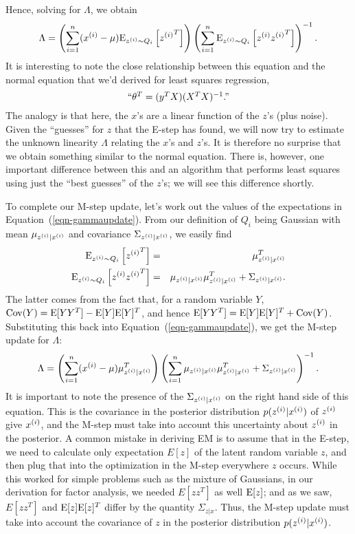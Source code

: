 \documentclass{article}
\begin{document}
Hence, solving for $\Lambda$, we obtain
\begin{equation}
\Lambda =
\left(\sum_{i=1}^{n} ({x^{(i)}}-\mu) {\rm E}_{{z^{(i)}} \sim Q_i}\left[{z^{(i)}}^T \right]\right)
\left(\sum_{i=1}^{n} {\rm E}_{{z^{(i)}} \sim Q_i} \left[ {z^{(i)}} {z^{(i)}}^T\right]\right)^{-1}.
\label{eqn-gammaupdate}
\end{equation}
It is interesting to note the close relationship between this equation and
the normal equation that we'd derived for least squares regression,
\[
\hbox{``$\theta^T = (y^TX)(X^TX)^{-1}$.''}
\]
The analogy is that here, the $x$'s are a linear function of the $z$'s (plus noise).  Given
the ``guesses'' for $z$ that the E-step has found, we will now try to estimate
the unknown linearity $\Lambda$ relating the $x$'s and $z$'s.  It is therefore no
surprise that we obtain something similar to the normal equation.  There is, however,
one important difference between this and an algorithm that performs least squares using
just the ``best guesses'' of the $z$'s; we will see this difference shortly.

To complete our M-step update, let's work out the values of the expectations in Equation~(\ref{eqn-gammaupdate}).
From our definition of $Q_i$ being Gaussian with mean $\mu_{{z^{(i)}}|{x^{(i)}}}$ and covariance $\Sigma_{{z^{(i)}}|{x^{(i)}}}$, we
easily find
\begin{eqnarray*}
{\rm E}_{{z^{(i)}} \sim Q_i}\left[{z^{(i)}}^T \right] &=& \mu_{{z^{(i)}}|{x^{(i)}}}^T \\
{\rm E}_{{z^{(i)}} \sim Q_i} \left[ {z^{(i)}} {z^{(i)}}^T\right] &=&
\mu_{{z^{(i)}}|{x^{(i)}}} \mu_{{z^{(i)}}|{x^{(i)}}}^T + \Sigma_{{z^{(i)}}|{x^{(i)}}}.
\end{eqnarray*}
The latter comes from the fact that, for a random variable $Y$,
${\rm Cov}(Y) = {\rm E}[YY^T] - {\rm E}[Y]{\rm E}[Y]^T$, and hence
${\rm E}[YY^T] = {\rm E}[Y]{\rm E}[Y]^T + {\rm Cov}(Y)$.
Substituting this back into Equation~(\ref{eqn-gammaupdate}), we get the M-step update
for $\Lambda$:
\begin{equation}
\Lambda =
\left(\sum_{i=1}^{n} ({x^{(i)}}-\mu) \mu_{{z^{(i)}}|{x^{(i)}}}^T\right)
\left(\sum_{i=1}^{n} \mu_{{z^{(i)}}|{x^{(i)}}} \mu_{{z^{(i)}}|{x^{(i)}}}^T + \Sigma_{{z^{(i)}}|{x^{(i)}}}\right)^{-1}.
\end{equation}
It is important to note the presence of the $\Sigma_{{z^{(i)}}|{x^{(i)}}}$ on the right
hand side of this equation.  This is the covariance in the posterior distribution
$p({z^{(i)}}|{x^{(i)}})$ of ${z^{(i)}}$ give ${x^{(i)}}$, and the M-step must take into account this uncertainty
about ${z^{(i)}}$ in the posterior. A common mistake in deriving EM is to assume that in the E-step,
we need to calculate only expectation $E[z]$ of the latent random variable $z$,
and then plug that into the optimization in the M-step everywhere $z$ occurs.
While this worked for simple problems such as the mixture of Gaussians, in our
derivation for factor analysis,
we needed $E[zz^T]$ as well ${\rm E}[z]$; and as we saw,
$E[zz^T]$ and ${\rm E}[z]{\rm E}[z]^T$ differ by the quantity $\Sigma_{z|x}$.
Thus, the M-step update must take into account the covariance of $z$
in the posterior distribution $p({z^{(i)}}|{x^{(i)}})$.
\end{document}
